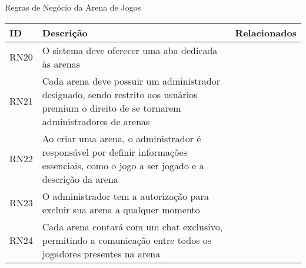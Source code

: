 \begin{quadro}
\centering
\caption{Regras de Negócio da Arena de Jogos}
\label{tab:regrasdenegocio3}
\begin{longtable}{|p{2.5cm}|p{10.0cm}|p{2.5cm}|}
\hline
ID & Descrição & Relacionados
\\\hline
RN20 & O sistema deve oferecer uma aba dedicada às arenas &  \
\\\hline
RN21 & Cada arena deve possuir um administrador designado, sendo restrito aos usuários premium o direito de se tornarem administradores de arenas &  \
\\\hline
RN22 & Ao criar uma arena, o administrador é responsável por definir informações essenciais, como o jogo a ser jogado e a descrição da arena &  \
\\\hline
RN23 & O administrador tem a autorização para excluir sua arena a qualquer momento &  \
\\\hline
RN24 & Cada arena contará com um chat exclusivo, permitindo a comunicação entre todos os jogadores presentes na arena &  \
\\\hline
\end{longtable}
\fonte{Os Autores.}
\end{quadro}